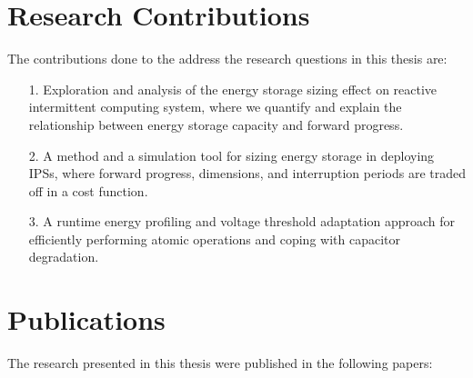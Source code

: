 \begin{enumerate}
  
\end{enumerate}

\section{Research Contributions}



The contributions done to the address the research questions in this thesis are:
\begin{itemize}
  \item[1.] Exploration and analysis of the energy storage sizing effect on reactive intermittent computing system, where we quantify and explain the relationship between energy storage capacity and forward progress.
  \item[2.] A method and a simulation tool for sizing energy storage in deploying IPSs, where forward progress, dimensions, and interruption periods are traded off in a cost function.
  \item[3.] A runtime energy profiling and voltage threshold adaptation approach for efficiently performing atomic operations and coping with capacitor degradation. 
\end{itemize}


\section{Publications}

The research presented in this thesis were published in the following papers:

